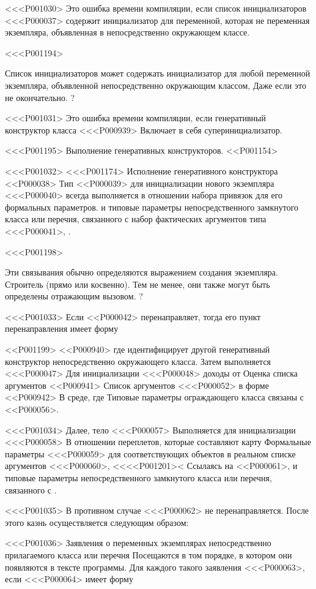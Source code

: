 {<<<P001030>%
Это ошибка времени компиляции, если список инициализаторов <<<P000037> содержит
инициализатор для переменной, которая не
переменная экземпляра, объявленная в непосредственно окружающем классе.

<<<P001194>{%
Список инициализаторов может содержать инициализатор для
любой переменной экземпляра, объявленной непосредственно окружающим классом,
Даже если это не окончательно.%
?

<<<P001031>%
Это ошибка времени компиляции, если генеративный конструктор класса <<<P000939>
Включает в себя суперинициализатор.


<<<P001195> Выполнение генеративных конструкторов.
<<P001154>

<<<P001032>%
<<<P001174>%
Исполнение генеративного конструктора <<P000038> Тип <<P000039>
для инициализации нового экземпляра <<<P000040>
всегда выполняется в отношении набора привязок для его формальных параметров.
и типовые параметры непосредственного замкнутого класса или перечня, связанного с
набор фактических аргументов типа <<<P000041>, .

<<<P001198>{%
Эти связывания обычно определяются выражением создания экземпляра.
Строитель (прямо или косвенно).
Тем не менее, они также могут быть определены отражающим вызовом.
?

<<<P001033>%
Если <<P000042> перенаправляет, тогда его пункт перенаправления имеет форму

<<P001199>
<<P000940>
где  идентифицирует другой генеративный конструктор
непосредственно окружающего класса.
Затем выполняется <<<P000047> Для инициализации <<<P000048> доходы от
Оценка списка аргументов
<<P000941>
Список аргументов <<<P000052> в форме
<<P000942>
В среде, где
Типовые параметры ограждающего класса связаны с
<<P000056>.

<<<P001034>%
Далее, тело <<<P000057> Выполняется для инициализации <<<P000058>
В отношении переплетов, которые составляют карту
Формальные параметры <<<P000059> для соответствующих объектов
в реальном списке аргументов <<<P000060>,
<<<<P001201>< Ссылаясь на <<P000061>,
и типовые параметры непосредственного замкнутого класса или перечня, связанного с
.

<<<P001035>%
В противном случае <<<P000062> не перенаправляется.
После этого казнь осуществляется следующим образом:

<<<P001036>%
Заявления о переменных экземплярах непосредственно прилагаемого класса или перечня
Посещаются в том порядке, в котором они появляются в тексте программы.
Для каждого такого заявления <<<P000063>, если <<<P000064> имеет форму
}}}
